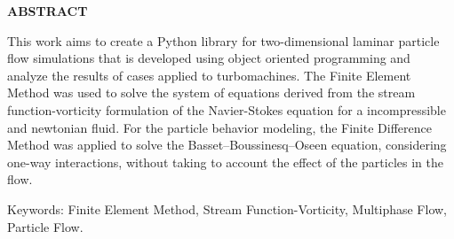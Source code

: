 \begin{center}
\textbf{ABSTRACT}
\end{center}

$\!$\\


This work aims to create a Python library for two-dimensional laminar particle flow simulations that is developed using object oriented programming and analyze the results of cases applied to turbomachines.
The Finite Element Method was used to solve the system of equations derived from the stream function-vorticity formulation of the Navier-Stokes equation for a incompressible and newtonian fluid.
For the particle behavior modeling, the Finite Difference Method was applied to solve the Basset–Boussinesq–Oseen equation, considering one-way interactions, without taking to account the effect of the particles in the flow.

\vspace{1cm}

\hspace{-1.3cm}Keywords: Finite Element Method, Stream Function-Vorticity, Multiphase Flow, Particle Flow.